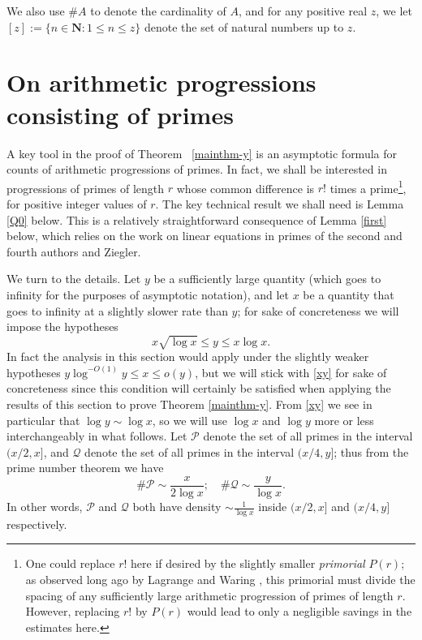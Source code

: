 \documentclass[12pt]{amsart}
\numberwithin{equation}{section}  %
\theoremstyle{remark}
\theoremstyle{plain}
\numberwithin{equation}{section}
\renewcommand{\leq}{\leqslant}
\renewcommand{\(}{\left(}
\renewcommand{\)}{\right)}
\newcommand{\asym}{\sim}   %
\newcommand{\PP}{\mathcal{P}}
\newcommand{\QQ}{\mathcal{Q}}
\begin{document}
We also use $\# A$ to denote the cardinality of $A$, and
for any positive real $z$, we let $[z] := \{ n \in \mathbf{N}: 1 \leq
n \leq z \}$ denote the set of natural numbers up to $z$.


%
\section{On arithmetic progressions consisting of primes}\label{sec:prime-progressions}
%

A key tool in the proof of Theorem ~\ref{mainthm-y} is an asymptotic formula
for counts of arithmetic progressions of primes. In fact, we shall be
interested in progressions of primes of length $r$ whose common
difference is $r!$ times a prime\footnote{One could replace $r!$ here
  if desired by the slightly smaller \emph{primorial} $P(r)$; 
as observed long ago by Lagrange and Waring \cite{dickson}, this primorial must divide the spacing of any sufficiently large arithmetic progression of primes of length $r$.  However, replacing $r!$ by $P(r)$ would lead to only a negligible savings in the estimates here.}, for positive integer values of
$r$. The key technical result we shall need is Lemma \ref{Q0} below. 
This is a relatively straightforward consequence of Lemma \ref{first} below, which relies on the work on linear equations in primes of the second and fourth authors and Ziegler.

We turn to the details.  Let $y$ be a sufficiently large quantity (which goes to infinity for the purposes of asymptotic notation), and let $x$ be a quantity that goes to infinity at a slightly slower rate than $y$; for sake of concreteness we will impose the hypotheses
\begin{equation}\label{xy}
x \sqrt{\log x} \leq y \leq x \log x.
\end{equation}
In fact the analysis in this section would apply under the slightly weaker hypotheses $y \log^{-O(1)} y \leq x \leq o(y)$, but we will stick with \eqref{xy} for sake of concreteness since this condition will certainly be satisfied when applying the results of this section to prove Theorem \ref{mainthm-y}.
From \eqref{xy} we see in particular that $\log y \asym \log x$, so we will use $\log x$ and $\log y$ more or less interchangeably in what follows.
Let $\PP$ denote the set of all primes in the interval $(x/2,x]$, and $\QQ$ denote the set of all primes in the interval $(x/4, y]$; thus from the prime number theorem we have
\begin{equation}\label{pq}
\# \PP \asym \frac{x}{2\log x}; \quad \# \QQ \asym \frac{y}{\log x}.
\end{equation}
In other words, $\PP$ and $\QQ$ both have density $\asym \frac{1}{\log x}$ inside $(x/2,x]$ and $(x/4,y]$ respectively.
\end{document}
